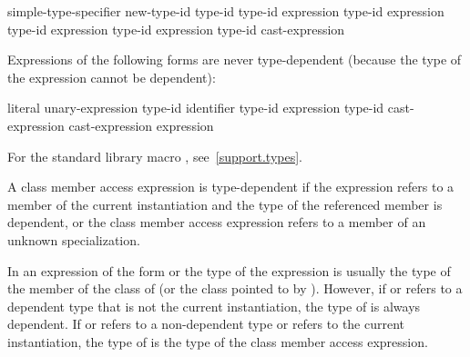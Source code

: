 \begin{ncsimplebnf}
simple-type-specifier \terminal{(}  \terminal{)}\br
{}  new-type-id \br
{}  \terminal{(} type-id \terminal{)} \br
{} type-id \terminal{> (} expression \terminal{)}\br
{} type-id \terminal{> (} expression \terminal{)}\br
{} type-id \terminal{> (} expression \terminal{)}\br
{} type-id \terminal{> (} expression \terminal{)}\br
\terminal{(} type-id \terminal{)} cast-expression
\end{ncsimplebnf}

\pnum
Expressions of the following forms are never type-dependent (because the type
of the expression cannot be dependent):

\begin{ncsimplebnf}
literal\br
{} unary-expression\br
{} type-id \terminal{)}\br
{}  \terminal{(} identifier \terminal{)}\br
{} type-id \terminal{)}\br
{} expression \terminal{)}\br
{} type-id \terminal{)}\br
{} cast-expression\br
{} cast-expression\br
{} \br
{} \terminal{(} expression \terminal{)}
\end{ncsimplebnf}

\begin{note} For the standard library macro ,
see~\ref{support.types}.\end{note}

\pnum
A class member access expression is
type-dependent if
the expression refers to a member of the current instantiation and
the type of the referenced member is dependent, or the class member access
expression refers to a member of an unknown specialization.
\begin{note}
In an expression of the form
or
the type of the expression is usually the type of the member
of the class of
(or the class pointed to by
).
However, if
or
refers to a dependent type that is not the current instantiation,
the type of
is always dependent. If
or 
refers to a non-dependent type or refers to the current instantiation, the
type of
is the type of the class member access expression.
\end{note}

